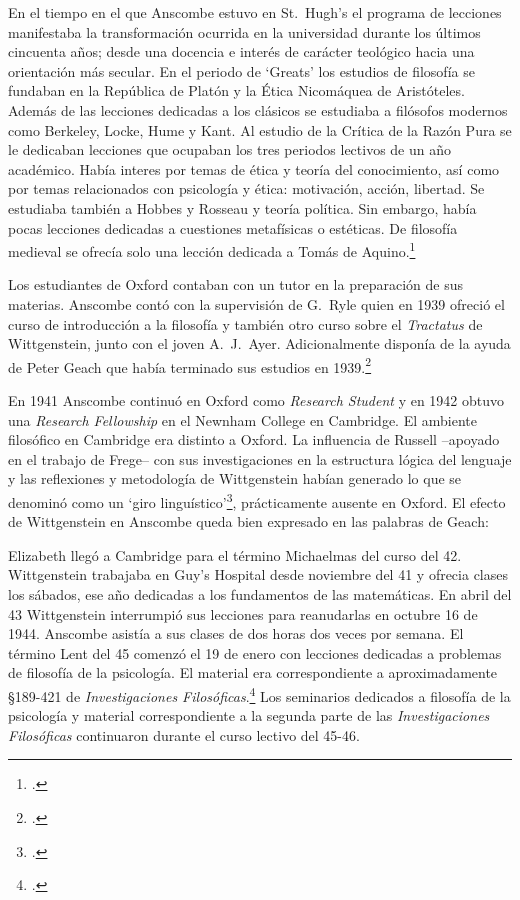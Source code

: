 En el tiempo en el que Anscombe estuvo en St.~Hugh's el programa de lecciones
manifestaba la transformación ocurrida en la universidad durante los últimos
cincuenta años; desde una docencia e interés de carácter teológico hacia una
orientación más secular. En el periodo de `Greats' los estudios de filosofía se
fundaban en la República de Platón y la Ética Nicomáquea de Aristóteles. Además
de las lecciones dedicadas a los clásicos se estudiaba a filósofos modernos como
Berkeley, Locke, Hume y Kant. Al estudio de la Crítica de la Razón Pura se le
dedicaban lecciones que ocupaban los tres periodos lectivos de un año académico.
Había interes por temas de ética y teoría del conocimiento, así como por temas
relacionados con psicología y ética: motivación, acción, libertad. Se estudiaba
también a Hobbes y Rosseau y teoría política. Sin embargo, había pocas lecciones
dedicadas a cuestiones metafísicas o estéticas. De filosofía medieval se ofrecía
solo una lección dedicada a Tomás de Aquino.\footcite[cf.~][pp.~23-24]{accint}

Los estudiantes de Oxford contaban con un tutor en la preparación de sus
materias. Anscombe contó con la supervisión de G.~Ryle quien en 1939 ofreció el
curso de introducción a la filosofía y también otro curso sobre el
\emph{Tractatus} de Wittgenstein, junto con el joven A.~J.~Ayer. Adicionalmente
disponía de la ayuda de Peter Geach que había terminado sus estudios en
1939.\footcite[cf.~][p.~24]{accint}

En 1941 Anscombe continuó en Oxford como \emph{Research Student} y en 1942
obtuvo una \emph{Research Fellowship} en el Newnham College en Cambridge. El
ambiente filosófico en Cambridge era distinto a Oxford. La influencia de Russell
--apoyado en el trabajo de Frege-- con sus investigaciones en la estructura
lógica del lenguaje y las reflexiones y metodología de Wittgenstein habían
generado lo que se denominó como un `giro
linguístico'\footcite[cf.~][p.14]{phiaut}, prácticamente ausente en Oxford. El
efecto de Wittgenstein en Anscombe queda bien expresado en las palabras de
Geach: 

Elizabeth llegó a Cambridge para el término Michaelmas del curso del 42.
Wittgenstein trabajaba en Guy's Hospital desde noviembre del 41 y ofrecia clases
los sábados, ese año dedicadas a los fundamentos de las matemáticas. En abril
del 43 Wittgenstein interrumpió sus lecciones para reanudarlas en octubre 16 de
1944. Anscombe asistía a sus clases de dos horas dos veces por semana. El
término Lent del 45 comenzó el 19 de enero con lecciones dedicadas a problemas
de filosofía de la psicología. El material era correspondiente a aproximadamente
\S189-421 de \emph{Investigaciones
  Filosóficas}.\footcite[cf.~][pp.~354-356]{pubnpriv} Los seminarios dedicados a
filosofía de la psicología y material correspondiente a la segunda parte de las
\emph{Investigaciones Filosóficas} continuaron durante el curso lectivo del
45-46.

